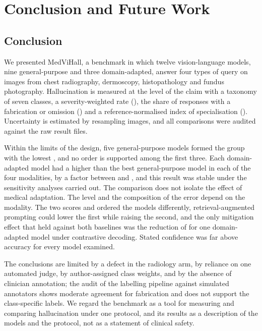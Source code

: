 \section{Conclusion and Future Work}\label{sec:conclusion}

\subsection{Conclusion}
We presented MedViHall, a benchmark in which twelve vision-language models, nine general-purpose and three domain-adapted, answer four types of query on images from chest radiography, dermoscopy, histopathology and fundus photography. Hallucination is measured at the level of the claim with a taxonomy of seven classes, a severity-weighted rate (\SMHR{}), the share of responses with a fabrication or omission (\CHR{}) and a reference-normalised index of specialisation (\SRI{}). Uncertainty is estimated by resampling images, and all comparisons were audited against the raw result files.

Within the limits of the design, five general-purpose models formed the group with the lowest \SMHR{}, and no order is supported among the first three. Each domain-adapted model had a higher \SMHR{} than the best general-purpose model in each of the four modalities, by a factor between  and , and this result was stable under the sensitivity analyses carried out. The comparison does not isolate the effect of medical adaptation. The level and the composition of the error depend on the modality. The two scores \SMHR{} and \CHR{} ordered the models differently, retrieval-augmented prompting could lower the first while raising the second, and the only mitigation effect that held against both baselines was the reduction of \SMHR{} for one domain-adapted model under contrastive decoding. Stated confidence was far above accuracy for every model examined.

The conclusions are limited by a defect in the radiology arm, by reliance on one automated judge, by author-assigned class weights, and by the absence of clinician annotation; the audit of the labelling pipeline against simulated annotators shows moderate agreement for fabrication and does not support the class-specific labels. We regard the benchmark as a tool for measuring and comparing hallucination under one protocol, and its results as a description of the models and the protocol, not as a statement of clinical safety.

